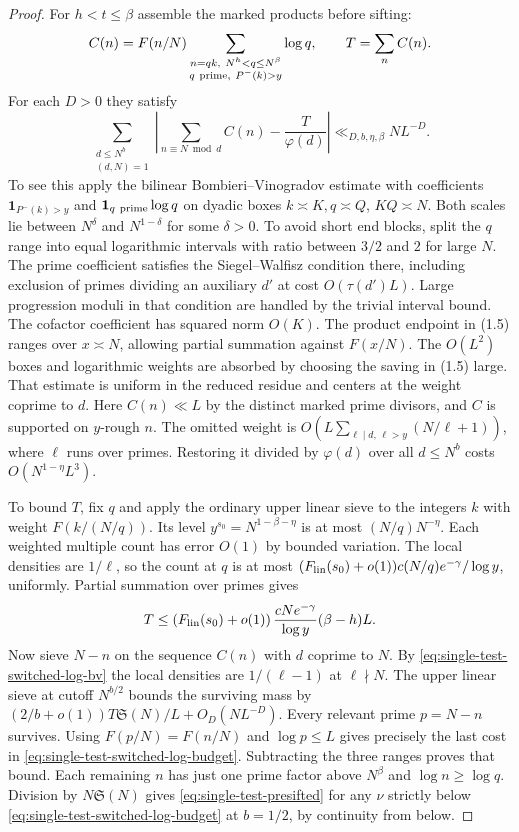 \documentclass[11pt,a4paper]{article}
\numberwithin{equation}{section}
\newcommand{\SSS}{\mathfrak S}
\begin{document}
\begin{proof}
For $h<t\le\beta$ assemble the marked products before sifting:
\[
 C(n)= F(n/N)\sum_{\substack{n=qk,\ N^h<q\le N^\beta\\
                            q\ {\rm prime},\ P^-(k)>y}}\log q,
 \qquad T=\sum_n C(n).
\]
For each $D>0$ they satisfy
\begin{equation}
 \sum_{\substack{d\le N^b\\(d,N)=1}}
 \left|\sum_{n\equiv N\bmod d}C(n)-\frac{T}{\varphi(d)}\right|
       \ll_{D,b,\eta,\beta} NL^{-D}.
 \label{eq:single-test-switched-log-bv}
\end{equation}
To see this apply the bilinear Bombieri--Vinogradov estimate
\cite[Theorem~0(b), (1.5)]{BFI1986} with coefficients
$\mathbf1_{P^-(k)>y}$ and $\mathbf1_{q\ {\rm prime}}\log q$
on dyadic boxes $k\asymp K,q\asymp Q$, $KQ\asymp N$.
Both scales lie between $N^\delta$ and $N^{1-\delta}$ for
some $\delta>0$. To avoid short end blocks, split the $q$ range
into equal logarithmic intervals with ratio between $3/2$ and $2$
for large $N$. The prime coefficient satisfies the Siegel--Walfisz
condition there, including exclusion of primes dividing an auxiliary
$d'$ at cost $O(\tau(d')L)$. Large progression moduli in that
condition are handled by the trivial interval bound.
The cofactor coefficient has squared norm $O(K)$. The product
endpoint in (1.5) ranges over $x\asymp N$, allowing partial
summation against $F(x/N)$. The $O(L^2)$ boxes and logarithmic
weights are absorbed by choosing the saving in (1.5) large.
That estimate is uniform in the reduced residue and centers at
the weight coprime to $d$. Here $C(n)\ll L$ by the distinct
marked prime divisors, and $C$ is supported on $y$-rough $n$.
The omitted weight is $O(L\sum_{\ell\mid d,\,\ell>y}(N/\ell+1))$,
where $\ell$ runs over primes. Restoring it divided by $\varphi(d)$
over all $d\le N^b$ costs $O(N^{1-\eta}L^3)$.

To bound $T$, fix $q$ and apply the ordinary upper linear sieve
to the integers $k$ with weight $F(k/(N/q))$. Its level
$y^{s_0}=N^{1-\beta-\eta}$ is at most $(N/q)N^{-\eta}$.
Each weighted multiple count has error $O(1)$ by bounded
variation. The local densities are $1/\ell$, so the count
at $q$ is at most $(F_{\rm lin}(s_0)+o(1))c(N/q)e^{-\gamma}/\log y$,
uniformly. Partial summation over primes gives
\[
 T\le (F_{\rm lin}(s_0)+o(1))\,
          \frac{cN e^{-\gamma}}{\log y}(\beta-h)L .
\]
Now sieve $N-n$ on the sequence $C(n)$ with $d$ coprime to $N$.
By \eqref{eq:single-test-switched-log-bv} the local densities
are $1/(\ell-1)$ at $\ell\nmid N$. The upper linear sieve at
cutoff $N^{b/2}$ bounds the surviving mass by
$(2/b+o(1))T\SSS(N)/L+O_D(NL^{-D})$.
Every relevant prime $p=N-n$ survives. Using $F(p/N)=F(n/N)$
and $\log p\le L$ gives precisely the last cost in
\eqref{eq:single-test-switched-log-budget}. Subtracting the three
ranges proves that bound. Each remaining $n$ has just one prime
factor above $N^\beta$ and $\log n\ge\log q$. Division by
$N\SSS(N)$ gives \eqref{eq:single-test-presifted} for any
$\nu$ strictly below \eqref{eq:single-test-switched-log-budget}
at $b=1/2$, by continuity from below.


\end{proof}
\end{document}
